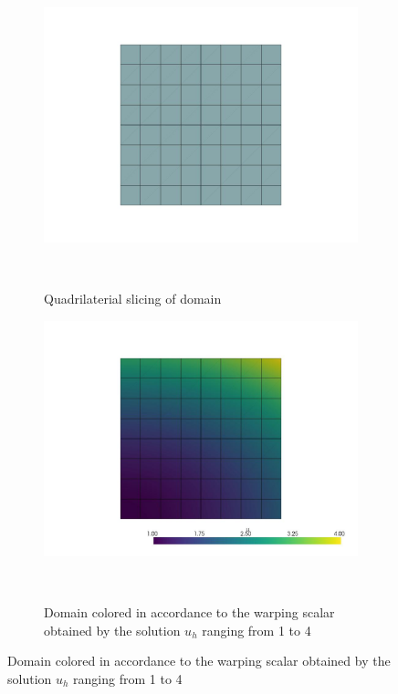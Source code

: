 \begin{figure}[H]
    \centering
    \begin{subfigure}{.3\textwidth}
        \centering
        \includegraphics[width=\textwidth]{Afsnit/Application/figurer/screenshot_1.jpeg}
        \caption{Quadrilaterial slicing of domain}~\label{fig:FEM_plot_domain}
      \end{subfigure}
    \begin{subfigure}{.3\textwidth}
        \centering
        \includegraphics[width=\textwidth]{Afsnit/Application/figurer/screenshot_2.jpeg}
        \caption{Domain colored in accordance to the warping scalar obtained by the solution $u_h$ ranging from 1 to 4}~\label{fig:FEM_plot_warped_domain}

\end{subfigure}
\end{figure}
